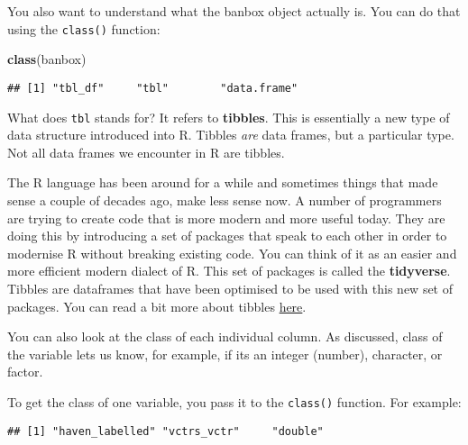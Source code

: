 \documentclass[
]{book}
\newenvironment{Shaded}{\begin{snugshade}}{\end{snugshade}}
\newcommand{\FunctionTok}[1]{\textcolor[rgb]{0.13,0.29,0.53}{\textbf{#1}}}
\newcommand{\NormalTok}[1]{#1}
\newcommand{\SpecialCharTok}[1]{\textcolor[rgb]{0.81,0.36,0.00}{\textbf{#1}}}
\begin{document}
You also want to understand what the banbox object actually is. You can do that using the \texttt{class()} function:

\begin{Shaded}
\begin{Highlighting}[]
\FunctionTok{class}\NormalTok{(banbox)}
\end{Highlighting}
\end{Shaded}

\begin{verbatim}
## [1] "tbl_df"     "tbl"        "data.frame"
\end{verbatim}

What does \texttt{tbl} stands for? It refers to \textbf{tibbles}. This is essentially a new type of data structure introduced into R. Tibbles \emph{are} data frames, but a particular type. Not all data frames we encounter in R are tibbles.

The R language has been around for a while and sometimes things that made sense a couple of decades ago, make less sense now. A number of programmers are trying to create code that is more modern and more useful today. They are doing this by introducing a set of packages that speak to each other in order to modernise R without breaking existing code. You can think of it as an easier and more efficient modern dialect of R. This set of packages is called the \textbf{tidyverse}. Tibbles are dataframes that have been optimised to be used with this new set of packages. You can read a bit more about tibbles \href{http://r4ds.had.co.nz/tibbles.html}{here}.

You can also look at the class of each individual column. As discussed, class of the variable lets us know, for example, if its an integer (number), character, or factor.

To get the class of one variable, you pass it to the \texttt{class()} function. For example:

\begin{Shaded}
\end{Shaded}

\begin{verbatim}
## [1] "haven_labelled" "vctrs_vctr"     "double"
\end{verbatim}

\begin{Shaded}
\end{Shaded}
\end{document}

